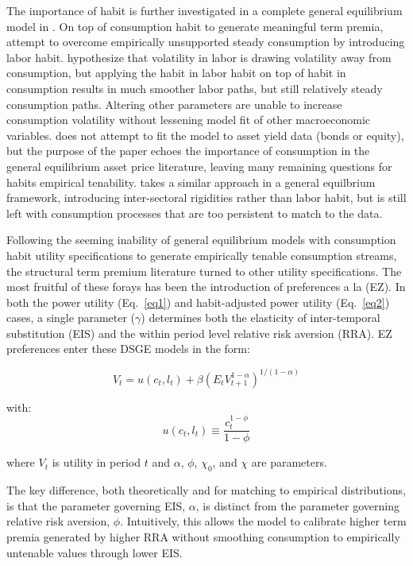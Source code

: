 \documentclass{article}
\numberwithin{equation}{section}
\begin{document}
The importance of habit is further investigated in a complete general
equilibrium model in \citet{lettauuhlig2000}. On top of consumption habit to
generate meaningful term premia, \citeauthor{lettauuhlig2000} attempt to
overcome empirically unsupported steady consumption by introducing labor habit.
\citeauthor{lettauuhlig2000} hypothesize that volatility in labor is drawing
volatility away from consumption, but applying the habit in labor habit on top
of habit in consumption results in much smoother labor paths, but still
relatively steady consumption paths. Altering other parameters are unable to
increase consumption volatility without lessening model fit of other
macroeconomic variables. \citeauthor{lettauuhlig2000} does not attempt to fit
the model to asset yield data (bonds or equity), but the purpose of the paper
echoes the importance of consumption in the general equilibrium asset price
literature, leaving many remaining questions for habits empirical tenability.
\citet{boldrinetal2001} takes a similar approach in a general equilbrium
framework, introducing inter-sectoral rigidities rather than labor habit, but
is still left with consumption processes that are too persistent to match to
the data.

Following the seeming inability of general equilibrium models with consumption
habit utility specifications to generate empirically tenable consumption
streams, the structural term premium literature turned to other utility
specifications. The most fruitful of these forays has been the introduction of
preferences a la \citet{epsteinzin1989} (EZ). In both the power utility
(Eq.~\ref{eq1}) and habit-adjusted power utility (Eq.~\ref{eq2}) cases,
a single parameter ($\gamma$) determines both the elasticity of inter-temporal
substitution (EIS) and the within period level relative risk aversion (RRA).
EZ preferences enter these DSGE models in the form: 

\begin{equation}
  V_t = u(c_t,l_t) + \beta(E_tV_{t+1}^{1-\alpha})^{1/(1-\alpha)}
  \label{eq3}
\end{equation}

with:
\begin{equation*}
  u(c_t,l_t)\equiv\frac{c_t^{1-\phi}}{1-\phi}
\end{equation*}

where $V_t$ is utility in period $t$ and $\alpha$, $\phi$, $\chi_0$, and $\chi$
are parameters.

The key difference, both theoretically and for matching to empirical
distributions, is that the parameter governing EIS, $\alpha$, is distinct from
the parameter governing relative risk aversion, $\phi$. Intuitively, this
allows the model to calibrate higher term premia generated by higher RRA
without smoothing consumption to empirically untenable values through lower
EIS.
\end{document}
